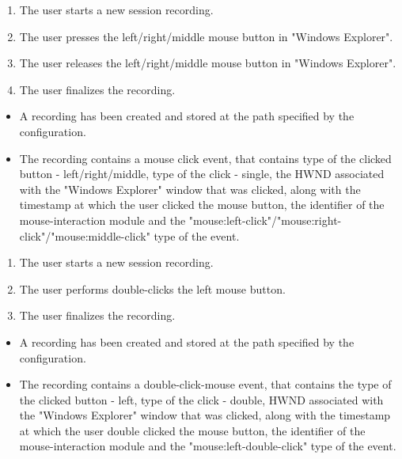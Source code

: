 \begin{tests}
	{\begin{enumerate}
		\item The \gls{user} starts a new \gls{session} recording.
		\item The \gls{user} presses the left/right/middle mouse button in "Windows Explorer".
		\item The \gls{user} releases the left/right/middle mouse button in "Windows Explorer".
		\item The \gls{user} finalizes the recording.
	\end{enumerate}}
	{\begin{itemize}
		\item A recording has been created and stored at the path specified by the configuration.
		\item The recording contains a mouse click \gls{event},  that contains type of the clicked button - left/right/middle, type of the click - single, the HWND associated with the "Windows Explorer" window that was clicked, along with the timestamp at which the \gls{user} clicked the mouse button, the identifier of the mouse-interaction module and the "mouse:left-click"/"mouse:right-click"/"mouse:middle-click" type of the event.
	\end{itemize}}
	
	{\begin{enumerate}
		\item The \gls{user} starts a new \gls{session} recording.
		\item The \gls{user} performs double-clicks the left mouse button.
		\item The \gls{user} finalizes the recording.
	\end{enumerate}}
	{\begin{itemize}
		\item A recording has been created and stored at the path specified by the configuration.
		\item The recording contains a double-click-mouse \gls{event},  that contains the type of the clicked button - left, type of the click - double, HWND associated with the "Windows Explorer" window that was clicked, along with the timestamp at which the \gls{user} double clicked the mouse button, the identifier of the mouse-interaction module and the "mouse:left-double-click" type of the event.
	\end{itemize}}
	

\end{tests}
